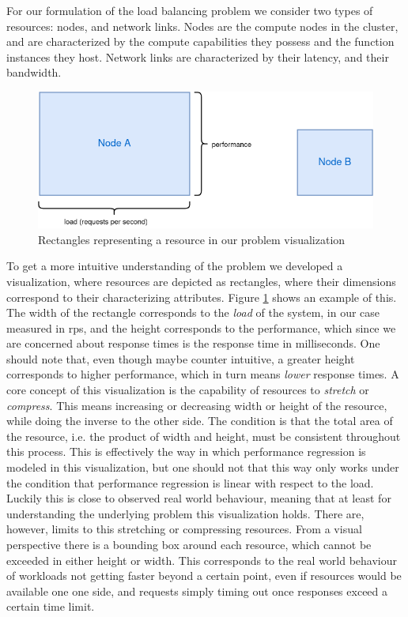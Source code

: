 For our formulation of the load balancing problem we consider two types of resources: nodes, and network links. Nodes are the compute nodes in the cluster, and are characterized by the compute capabilities they possess and the function instances they host. Network links are characterized by their latency, and their bandwidth.
\begin{figure}
    \centering
    \includegraphics[width=12cm]{graphics/diagrams/load_balancer_squares.png}
    \caption{Rectangles representing a resource in our problem visualization}
    \label{fig:lb_squares_basic}
\end{figure}
To get a more intuitive understanding of the problem we developed a visualization, where resources are depicted as rectangles, where their dimensions correspond to their characterizing attributes. Figure \ref{fig:lb_squares_basic} shows an example of this. The width of the rectangle corresponds to the \textit{load} of the system, in our case measured in \gls{rps}, and the height corresponds to the performance, which since we are concerned about response times is the response time in milliseconds. One should note that, even though maybe counter intuitive, a greater height corresponds to higher performance, which in turn means \textit{lower} response times.
A core concept of this visualization is the capability of resources to \textit{stretch} or \textit{compress}. This means increasing or decreasing width or height of the resource, while doing the inverse to the other side. The condition is that the total area of the resource, i.e. the product of width and height, must be consistent throughout this process. This is effectively the way in which performance regression is modeled in this visualization, but one should not that this way only works under the condition that performance regression is linear with respect to the load. Luckily this is close to observed real world behaviour, %
meaning that at least for understanding the underlying problem this visualization holds.
There are, however, limits to this stretching or compressing resources. From a visual perspective there is a bounding box around each resource, which cannot be exceeded in either height or width. This corresponds to the real world behaviour of workloads not getting faster beyond a certain point, even if resources would be available one one side, and requests simply timing out once responses exceed a certain time limit.
